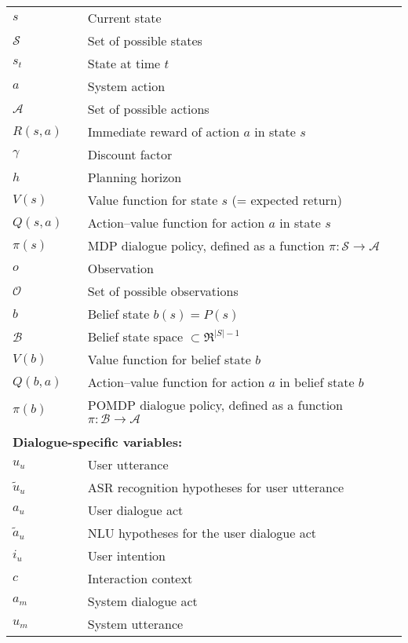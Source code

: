 \begin{longtable}{lp{5mm}p{11cm}}
$s$ && Current state \\
$\mathcal{S}$ && Set of possible states \\
$s_t$ && State at time $t$ \\
$a$ && System action \\ 
$\mathcal{A}$ && Set of possible actions \\
$R(s,a)$ && Immediate reward of action $a$ in state $s$ \\
$\gamma$ && Discount factor \\
$h$ && Planning horizon \\
$V(s)$ && Value function for state $s$ (= expected return) \\
$Q(s,a)$ && Action--value function for action $a$ in state $s$  \\
$\pi(s)$ && MDP dialogue policy, defined as a function $\pi: \mathcal{S} \rightarrow \mathcal{A} $ \\
$o$ && Observation \\
$\mathcal{O}$ && Set of possible observations \\
$b$ && Belief state $b(s) = P(s)$ \\
$\mathcal{B}$ && Belief state space $\subset \Re^{|S|-1}$ \\
$V(b)$ && Value function for belief state $b$  \\
$Q(b,a)$ && Action--value function for action $a$ in belief state $b$ \\
$\pi(b)$ && POMDP dialogue policy, defined as a function $\pi: \mathcal{B} \rightarrow \mathcal{A} $ \\


&&  \vspace{3mm} \\
\multicolumn{3}{l}{\textbf{Dialogue-specific variables:}} \vspace{2mm} \\

$u_u$ && User utterance \\
$\tilde{u}_u$ && ASR recognition hypotheses for user utterance \\
$a_u$ && User dialogue act \\
$\tilde{a}_u$ && NLU hypotheses for the user dialogue act \\
$i_u$ && User intention \\
$c$ && Interaction context \\
$a_m$ && System dialogue act \\
$u_m$ && System utterance \\


\end{longtable}
